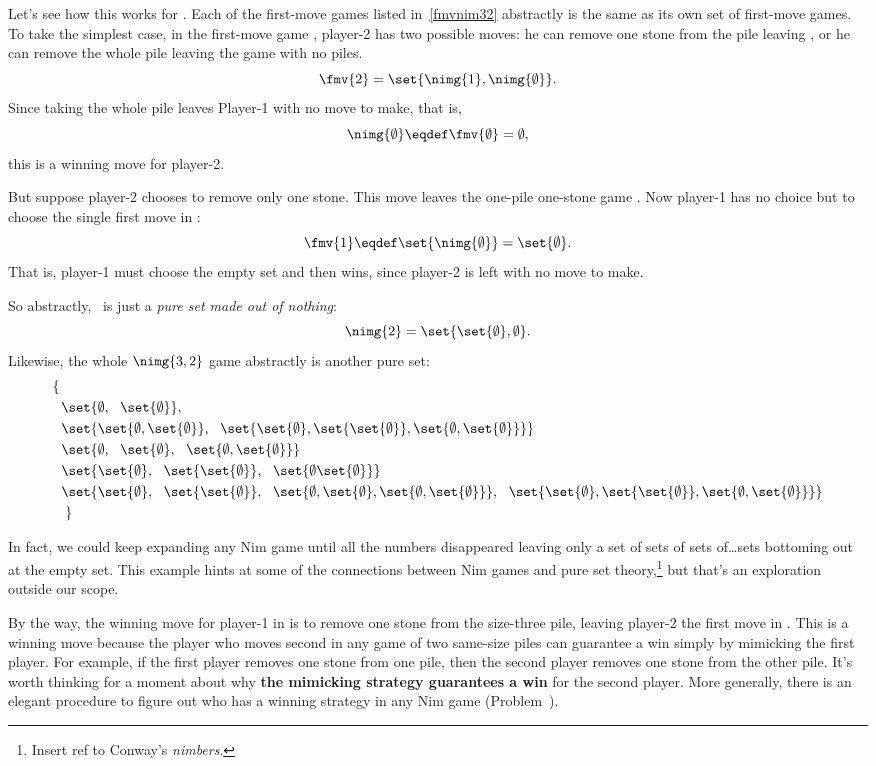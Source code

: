 \begin{definition}
Let's see how this works for .  Each of the first-move games
listed in~\eqref{fmvnim32} abstractly is the same as its own set of
first-move games.  To take the simplest case, in the first-move game
, player-2 has two possible moves: he can remove one stone
from the pile leaving , or he can remove the whole pile
leaving the game \nimg{\emptyset} with no piles.
\[
\fmv{2} = \set{\nimg{1}, \nimg{\emptyset}}.
\]
Since taking the whole pile leaves Player-1 with no move to make, that is,
\[
\nimg{\emptyset} \eqdef \fmv{\emptyset} = \emptyset,
\]
this is a winning move for player-2.

But suppose player-2 chooses to remove only one stone.  This move
leaves the one-pile one-stone game .  Now player-1 has no
choice but to choose the single first move in :
\[
\fmv{1} \eqdef \set{\nimg{\emptyset}} = \set{\emptyset}.
\]
That is, player-1 must choose the empty set and then wins, since
player-2 is left with no move to make.

So abstractly, \ is just a \emph{pure set made out of
  nothing}:
\[
\nimg{2} = \set{\set{\emptyset}, \emptyset}.
\]
Likewise, the whole $\nimg{3,2}$ game abstractly is another pure set:
\begin{align*}
\left\{ \right. & \\
& \set{\emptyset,\ \ \set{\emptyset}},\\
& \set{\set{\emptyset, \set{\emptyset}},\ \ \set{\set{\emptyset}, \set{\set{\emptyset}}, \set{\emptyset, \set{\emptyset}}}}\\
& \set{\emptyset,\ \ \set{\emptyset},\ \ \set{\emptyset, \set{\emptyset}}}\\
& \set{\set{\emptyset},\ \ \set{\set{\emptyset}},\ \ \set{\emptyset \set{\emptyset}}}\\
& \set{\set{\emptyset},\ \ \set{\set{\emptyset}},\ \ \set{\emptyset, \set{\emptyset}, \set{\emptyset, \set{\emptyset}}},\ \ \set{\set{\emptyset}, \set{\set{\emptyset}}, \set{\emptyset, \set{\emptyset}}}}\\
& \left. \right\}
\end{align*}

In fact, we could keep expanding any Nim game until all the numbers
disappeared leaving only a set of sets of sets of\dots sets bottoming out
at the empty set.  This example hints at some of the connections
between Nim games and pure set theory,\footnote{Insert ref to Conway's
  \emph{nimbers}.}  but that's an exploration outside our scope.

By the way, the winning move for player-1 in  is to remove
one stone from the size-three pile, leaving player-2 the first move in
.  This is a winning move because the player who moves
second in any game of two same-size piles can guarantee a win simply
by mimicking the first player.  For example, if the first player
removes one stone from one pile, then the second player removes one
stone from the other pile.  It's worth thinking for a moment about why
\textbf{the mimicking strategy guarantees a win} for the second
player.  More generally, there is an elegant procedure to figure out
who has a winning strategy in any Nim game
(Problem~).


\end{definition}
